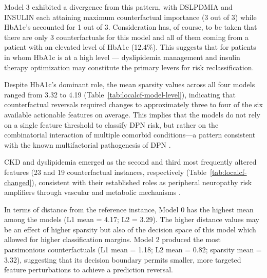 \documentclass[pdflatex,sn-vancouver-num]{sn-jnl}
\begin{document}

Model 3 exhibited a divergence from this pattern, with DSLPDMIA and INSULIN each attaining maximum counterfactual importance (3 out of 3) while HbA1c's accounted for 1 out of 3. Consideration has, of course, to be taken that there are only 3 counterfactuals for this model and all of them coming from a patient with an elevated level of HbA1c (12.4\%). This suggests that for patients in whom HbA1c is at a high level — dyslipidemia management and insulin therapy optimization may constitute the primary levers for risk reclassification.

Despite HbA1c's dominant role, the mean sparsity values across all four models ranged from 3.32 to 4.19 (Table~\ref{tab:localcf-model-level}), indicating that counterfactual reversals required changes to approximately three to four of the six available actionable features on average. This implies that the models do not rely on a single feature threshold to classify DPN risk, but rather on the combinatorial interaction of multiple comorbid conditions—a pattern consistent with the known multifactorial pathogenesis of DPN \cite{feldman2019}. 

CKD and dyslipidemia emerged as the second and third most frequently altered features (23 and 19 counterfactual instances, respectively (Table~\ref{tab:localcf-changed}), consistent with their established roles as peripheral neuropathy risk amplifiers through vascular and metabolic mechanisms \cite{jaiswal2017,callaghan2012}. 

In terms of distance from the reference instance, Model 0 has the highest mean among the models (L1 mean = 4.17; L2 = 3.29).  The higher distance values may be an effect of higher sparsity but also of the decision space of this model which allowed for higher classification margins.  Model 2 produced the most
parsimonious counterfactuals (L1 mean = 1.18; L2 mean = 0.82; sparsity mean = 3.32), suggesting that its decision boundary permits smaller, more targeted feature perturbations to achieve a prediction reversal.
\end{document}
